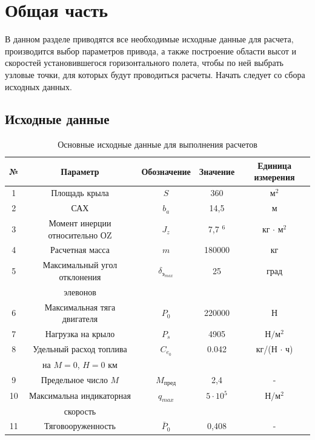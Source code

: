 \newpage
\section{Общая часть}

В данном разделе приводятся все необходимые исходные данные для расчета, производится выбор параметров привода, а также построение области высот и скоростей установившегося горизонтального полета, чтобы по ней выбрать узловые точки, для которых будут проводиться расчеты. Начать следует со сбора исходных данных.

\subsection{Исходные данные}
\begin{table}[H]
    \centering
    \label{tab:Основные исходные данные для выполнения расчетов}
    \caption{Основные исходные данные для выполнения расчетов }
    \begin{tabular}{|c||c|c|c|c|}
    \hline
        № & Параметр & Обозначение & Значение & Единица измерения\\ \hline \hline
        1 & Площадь крыла & $S$ & 360 & м$^2$ \\ \hline
        2 &  САХ & $b_a$ & 14,5 & м \\ \hline
        3 & Момент инерции относительно ОZ & $J_z$ & 7,7 \cdot 10$^6$ & кг $\cdot$ м$^2$ \\ \hline
        4 &Расчетная масса &$m$ & 180000 &  кг \\ \hline
        5 &Максимальный угол отклонения & $\delta_{\text{э}_{max}}$ & 25 &град \\ 
        & элевонов & & & \\ \hline
        6 &Максимальная тяга двигателя & $P_0$ & 220000 & Н \\ \hline
        7 & Нагрузка на крыло & $P_s$ & 4905 & ${\text{Н}}/{\text{м}^2}$ \\ \hline
        8 &Удельный расход топлива & $C_{e_0}$ & 0.042 & кг/(Н $\cdot$ ч) \\
        &на $M=0$, $H=0$ км & & & \\ \hline
        9 & Предельное число $M$ & $M_{\text{пред}}$ & 2,4 & - \\ \hline
        10 & Максимальна индикаторная  & $q_{max}$ & $5 \cdot 10^5$ & Н/м$^2$ \\ 
        & скорость & & & \\ \hline
        11 & Тяговооруженность & $\bar{P}_0$ & 0,408 & - \\ \hline
    \end{tabular}
\end{table}


